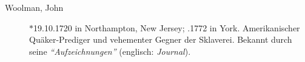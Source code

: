\begin{description}
\item[Woolman, John] $\ast$19.10.1720 in Northampton, New Jersey; .1772 in York. Amerikanischer Quäker-Prediger und vehementer Gegner der Sklaverei. Bekannt durch seine \textit{"`Aufzeichnungen"'} (englisch: \textit{Journal}).

 \end{description}


\normalsize